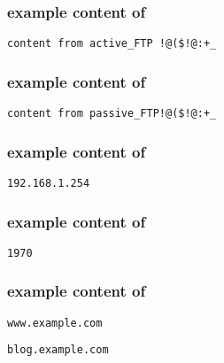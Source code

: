 \hypertarget{activeformat}{}
\subsubsection*{example content of \texttt{\hyperlink{cp1ftp}{\fileactive}}}
\begin{mdframed}
\begin{Verbatim}
content from active_FTP !@($!@:+_
\end{Verbatim}
\end{mdframed}

\pagebreak

\hypertarget{passiveformat}{}
\subsubsection*{example content of \texttt{\hyperlink{cp1ftp}{\filepassive}}}
\begin{mdframed}
\begin{Verbatim}
content from passive_FTP!@($!@:+_
\end{Verbatim}
\end{mdframed}

\hypertarget{portscanformat}{}
\subsubsection*{example content of \texttt{\hyperlink{cp1portscan}{\fileportscan}}}
\begin{mdframed}
\begin{Verbatim}
192.168.1.254
\end{Verbatim}
\end{mdframed}

\hypertarget{yearformat}{}
\subsubsection*{example content of \texttt{\hyperlink{cp1year}{\fileyear}}}
\begin{mdframed}
\begin{Verbatim}
1970
\end{Verbatim}
\end{mdframed}

\hypertarget{domainformat}{}
\subsubsection*{example content of \texttt{\hyperlink{cp1domain}{\filedomain}}}
\begin{mdframed}
\begin{Verbatim}
www.example.com
\end{Verbatim}
\end{mdframed}
\vspace{-15pt}
\begin{mdframed}
\begin{Verbatim}
blog.example.com
\end{Verbatim}
\end{mdframed}

